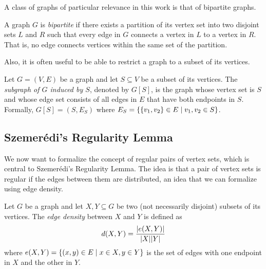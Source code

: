         A class of graphs of particular relevance in this work is that of bipartite graphs.

        \begin{definition}
            A graph $G$ is \emph{bipartite} if there exists a partition of its vertex set into two disjoint sets
            $L$ and $R$ such that every edge in $G$ connects a vertex in $L$ to a vertex in $R$.
            That is, no edge connects vertices within the same set of the partition.
        \end{definition}

        Also, it is often useful to be able to restrict a graph to a subset of its vertices.

        \begin{definition}
            Let $G = (V, E)$ be a graph and let $S \subseteq V$ be a subset of its vertices.
            The \emph{subgraph of $G$ induced by $S$}, denoted by $G[S]$, is the graph whose vertex set is $S$ and whose edge
            set consists of all edges in $E$ that have both endpoints in $S$.
            Formally, $G[S] = (S, E_S)$ where $E_S = \{ \{ v_1, v_2 \} \in E \mid v_1, v_2 \in S \}$.
        \end{definition}

    \subsection{Szemer\'edi's Regularity Lemma} \label{subsec:subsection_2.2}
        We now want to formalize the concept of regular pairs of vertex sets, which is central to Szemer\'edi's Regularity Lemma.
        The idea is that a pair of vertex sets is regular if the edges between them are  distributed,
        an idea that we can formalize using edge density.

        \begin{definition}
            Let $G$ be a graph and let $X, Y \subseteq G$ be two (not necessarily disjoint) subsets of its vertices.
            The \emph{edge density} between $X$ and $Y$ is defined as
            \[
                d(X, Y) = \frac{| e(X, Y) |}{|X| |Y|}
            \]
            where $e(X, Y) = \{ ( x, y ) \in E \mid x \in X, y \in Y \}$ is the set of edges with one endpoint in
            $X$ and the other in $Y$.
        \end{definition}

